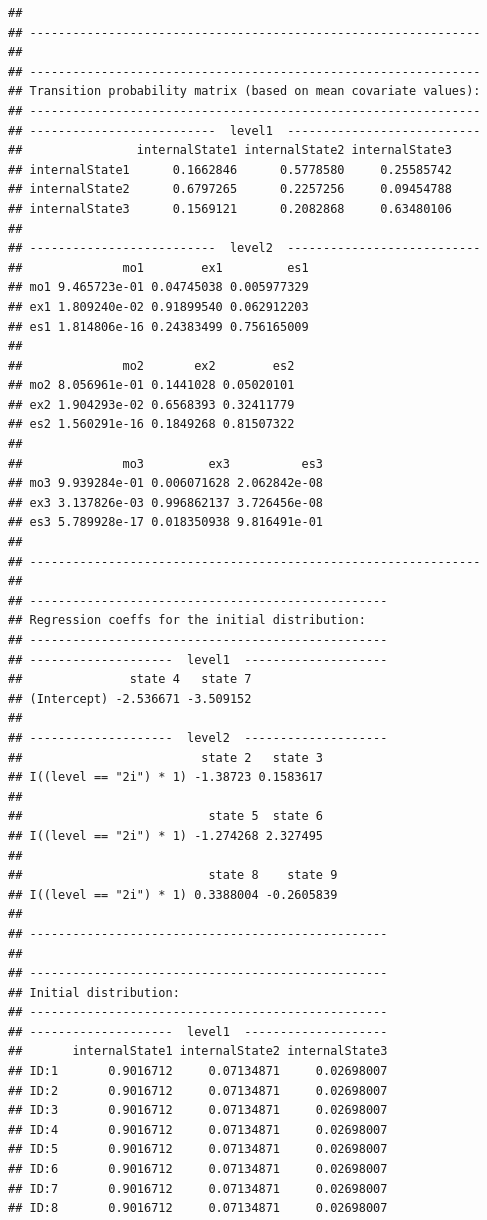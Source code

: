 \documentclass[12pt]{article}\usepackage[]{graphicx}\usepackage[]{xcolor}
\makeatletter
\newenvironment{kframe}{%
 \def\at@end@of@kframe{}%
 \ifinner\ifhmode%
  \def\at@end@of@kframe{\end{minipage}}%
  \begin{minipage}{\columnwidth}%
 \fi\fi%
 \def\FrameCommand##1{\hskip\@totalleftmargin \hskip-\fboxsep
 \colorbox{shadecolor}{##1}\hskip-\fboxsep
     \hskip-\linewidth \hskip-\@totalleftmargin \hskip\columnwidth}%
 \MakeFramed {\advance\hsize-\width
   \@totalleftmargin\z@ \linewidth\hsize
   \@setminipage}}%
 {\par\unskip\endMakeFramed%
 \at@end@of@kframe}
\newenvironment{knitrout}{}{} %
\makeatother
\begin{document}
\begin{knitrout}
\begin{kframe}
\begin{verbatim}
## 
## ---------------------------------------------------------------
## 
## ---------------------------------------------------------------
## Transition probability matrix (based on mean covariate values):
## ---------------------------------------------------------------
## --------------------------  level1  ---------------------------
##                internalState1 internalState2 internalState3
## internalState1      0.1662846      0.5778580     0.25585742
## internalState2      0.6797265      0.2257256     0.09454788
## internalState3      0.1569121      0.2082868     0.63480106
## 
## --------------------------  level2  ---------------------------
##              mo1        ex1         es1
## mo1 9.465723e-01 0.04745038 0.005977329
## ex1 1.809240e-02 0.91899540 0.062912203
## es1 1.814806e-16 0.24383499 0.756165009
## 
##              mo2       ex2        es2
## mo2 8.056961e-01 0.1441028 0.05020101
## ex2 1.904293e-02 0.6568393 0.32411779
## es2 1.560291e-16 0.1849268 0.81507322
## 
##              mo3         ex3          es3
## mo3 9.939284e-01 0.006071628 2.062842e-08
## ex3 3.137826e-03 0.996862137 3.726456e-08
## es3 5.789928e-17 0.018350938 9.816491e-01
## 
## ---------------------------------------------------------------
## 
## --------------------------------------------------
## Regression coeffs for the initial distribution:
## --------------------------------------------------
## --------------------  level1  --------------------
##               state 4   state 7
## (Intercept) -2.536671 -3.509152
## 
## --------------------  level2  --------------------
##                         state 2   state 3
## I((level == "2i") * 1) -1.38723 0.1583617
## 
##                          state 5  state 6
## I((level == "2i") * 1) -1.274268 2.327495
## 
##                          state 8    state 9
## I((level == "2i") * 1) 0.3388004 -0.2605839
## 
## --------------------------------------------------
## 
## --------------------------------------------------
## Initial distribution:
## --------------------------------------------------
## --------------------  level1  --------------------
##       internalState1 internalState2 internalState3
## ID:1       0.9016712     0.07134871     0.02698007
## ID:2       0.9016712     0.07134871     0.02698007
## ID:3       0.9016712     0.07134871     0.02698007
## ID:4       0.9016712     0.07134871     0.02698007
## ID:5       0.9016712     0.07134871     0.02698007
## ID:6       0.9016712     0.07134871     0.02698007
## ID:7       0.9016712     0.07134871     0.02698007
## ID:8       0.9016712     0.07134871     0.02698007

\end{verbatim}
\end{kframe}
\end{knitrout}
\end{document}
